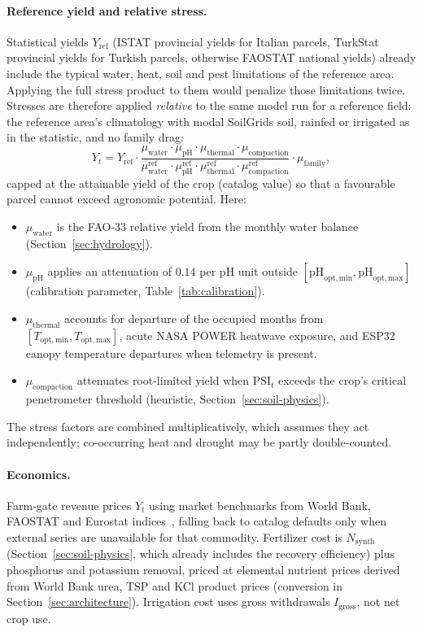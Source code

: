 \paragraph{Reference yield and relative stress.} Statistical yields $Y_{\mathrm{ref}}$ (ISTAT provincial yields for Italian parcels, TurkStat provincial yields for Turkish parcels, otherwise FAOSTAT national yields) already include the typical water, heat, soil and pest limitations of the reference area. Applying the full stress product to them would penalize those limitations twice. Stresses are therefore applied \emph{relative} to the same model run for a reference field: the reference area's climatology with modal SoilGrids soil, rainfed or irrigated as in the statistic, and no family drag:
\begin{equation}
  Y_t = Y_{\mathrm{ref}} \cdot \frac{\mu_{\mathrm{water}} \cdot \mu_{\mathrm{pH}} \cdot \mu_{\mathrm{thermal}} \cdot \mu_{\mathrm{compaction}}}{\mu^{\mathrm{ref}}_{\mathrm{water}} \cdot \mu^{\mathrm{ref}}_{\mathrm{pH}} \cdot \mu^{\mathrm{ref}}_{\mathrm{thermal}} \cdot \mu^{\mathrm{ref}}_{\mathrm{compaction}}} \cdot \mu_{\mathrm{family}},
\end{equation}
capped at the attainable yield of the crop (catalog value) so that a favourable parcel cannot exceed agronomic potential. Here:
\begin{itemize}[leftmargin=1.5em]
  \item $\mu_{\mathrm{water}}$ is the FAO-33 relative yield from the monthly water balance (Section~\ref{sec:hydrology}).
  \item $\mu_{\mathrm{pH}}$ applies an attenuation of $0.14$ per $\mathrm{pH}$ unit outside $[\mathrm{pH}_{\mathrm{opt,min}}, \mathrm{pH}_{\mathrm{opt,max}}]$ (calibration parameter, Table~\ref{tab:calibration}).
  \item $\mu_{\mathrm{thermal}}$ accounts for departure of the occupied months from $[T_{\mathrm{opt,min}}, T_{\mathrm{opt,max}}]$, acute NASA POWER heatwave exposure, and ESP32 canopy temperature departures when telemetry is present.
  \item $\mu_{\mathrm{compaction}}$ attenuates root-limited yield when $\mathrm{PSI}_t$ exceeds the crop's critical penetrometer threshold (heuristic, Section~\ref{sec:soil-physics}).
\end{itemize}
The stress factors are combined multiplicatively, which assumes they act independently; co-occurring heat and drought may be partly double-counted.

\paragraph{Economics.} Farm-gate revenue prices $Y_t$ using market benchmarks from World Bank, FAOSTAT and Eurostat indices~\cite{faostat2024}, falling back to catalog defaults only when external series are unavailable for that commodity. Fertilizer cost is $N_{\mathrm{synth}}$ (Section~\ref{sec:soil-physics}, which already includes the recovery efficiency) plus phosphorus and potassium removal, priced at elemental nutrient prices derived from World Bank urea, TSP and KCl product prices (conversion in Section~\ref{sec:architecture}). Irrigation cost uses gross withdrawals $I_{\mathrm{gross}}$, not net crop use.


